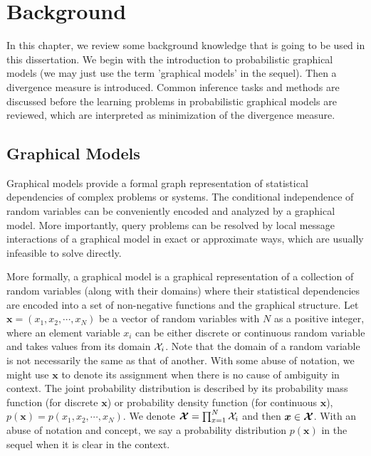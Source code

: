 \chapter{Background}
\label{chapter2}
In this chapter, we review some background knowledge that is going to be used in this dissertation. We begin with the introduction to probabilistic graphical models (we may just use the term 'graphical models' in the sequel). Then a divergence measure is introduced. Common inference tasks and methods are discussed before the learning problems in probabilistic graphical models are reviewed, which are interpreted as minimization of the divergence measure.

\section{Graphical Models}
\label{chpt2:sec:graphical-models}
Graphical models provide a formal graph representation of statistical dependencies of complex problems or systems. The conditional independence of random variables can be conveniently encoded and analyzed by a graphical model. More importantly, query problems can be resolved by local message interactions of a graphical model in exact or approximate ways, which are usually infeasible to solve directly.

More formally, a graphical model is a graphical representation of a collection of random variables (along with their domains) where their statistical dependencies are encoded into a set of non-negative functions and the graphical structure. Let $\bm{x}= (x_1, x_2, \cdots, x_N)$ be a vector of random variables with $N$ as a positive integer, where an element variable $x_i$ can be either discrete or continuous random variable and takes values from its domain $\mathcal{X}_i$. Note that the domain of a random variable is not necessarily the same as that of another. With some abuse of notation, we might use $\bm{x}$ to denote its assignment when there is no cause of ambiguity in context. The joint probability distribution is described by its probability mass function (for discrete $\bm{x}$) or probability density function (for continuous $\bm{x}$), $p(\bm{x})=p(x_1, x_2, \cdots, x_N)$. We denote $\bm{\mathcal{X}} = \prod_{x=1}^{N} \mathcal{X}_i$ and then $\bm{x}\in \bm{\mathcal{X}}$. With an abuse of notation and concept, we say a probability distribution $p(\bm{x})$ in the sequel when it is clear in the context.

